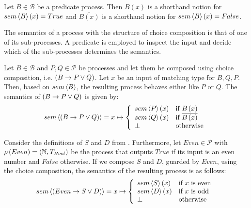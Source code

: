 \begin{definition}
Let $B \in \mathcal{B}$ be a predicate process. Then $B \left( x \right)$ is a shorthand notion for $sem \left\langle B \right\rangle \left( x \right) = True$ and $\overline{B \left( x \right)}$ is a shorthand notion for $sem \left\langle B \right\rangle \left( x \right) = False$.

\hfill\qedsymbol
\end{definition}

The semantics of a process with the structure of choice composition is that of one of its sub-processes. A predicate is employed to inspect the input and decide which of the sub-processes determines the semantics.
\begin{definition}
\label{def:sem_choice}
Let $B \in \mathcal{B}$ and $P, Q \in \mathcal{P}$ be processes and let them be composed using choice composition, i.e. $\left( B \to P \vee Q \right)$. Let $x$ be an input of matching type for $B, Q, P$. Then, based on $sem \left\langle B \right\rangle$, the resulting process behaves either like $P$ or $Q$. The semantics of $\left( B \to P \vee Q \right)$ is given by:
  \begin{equation*}
    \label{eqn:sem_choice}
    sem \left\langle \left( B \to P \vee Q \right) \right\rangle = x \mapsto \left\{ \begin{array}{ll}
      sem \left\langle P \right\rangle\left(x\right) & \text{if } B \left( x \right) \\
      sem \left\langle Q \right\rangle\left(x\right) & \text{if } \overline{B \left( x \right)} \\
      \bot & \text{otherwise}
    \end{array}\right.
  \end{equation*}
  
  \hfill\qedsymbol
\end{definition}

\begin{example}
\label{exp:sem_chice}
Consider the definitions of $S$ and $D$ from . Furthermore, let $Even \in \mathcal{P}$ with $\rho \left( Even \right) = \left( \mathbb{N}, T_{Bool} \right)$ be the process that outputs $True$ if its input is an even number and $False$ otherwise. If we compose $S$ and $D$, guarded by $Even$, using the choice composition, the semantics of the resulting process is as follows:
  \begin{equation*}
    sem \left\langle \left( Even \to S \vee D \right) \right\rangle = x \mapsto \left\{\begin{array}{ll}
      sem \left\langle S \right\rangle\left(x\right) & \text{if } x \text{ is even} \\
      sem \left\langle D \right\rangle\left(x\right) & \text{if } x \text{ is odd} \\
      \bot & \text{otherwise}
    \end{array}\right.
  \end{equation*}
\end{example}


